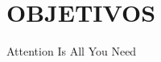 \documentclass[10pt]{article}
\begin{document}

\pagestyle{empty} %





\newpage
\pagestyle{fancy}
\setcounter{page}{2} %
\setcounter{equation}{0} %
\setcounter{figure}{0} %
\setcounter{table}{0} %
\section{OBJETIVOS}


Attention {Is} {All} {You} {Need}\cite{vaswani_attention_2017}

\newpage
\setcounter{equation}{0} %
\setcounter{figure}{0} %
\setcounter{table}{0} %
\end{document}
